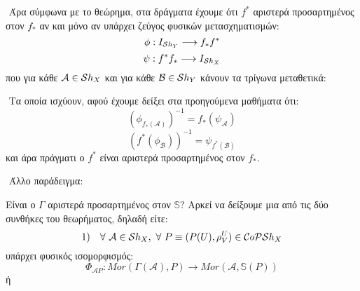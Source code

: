 $ $\newline
Άρα σύμφωνα με το θεώρημα, στα δράγματα έχουμε ότι $f^*$ αριστερά προσαρτημένος στον $f_*$ αν και μόνο αν υπάρχει ζεύγος φυσικών μετασχηματισμών:
$$\phi : I_{\mathcal{S} h_Y} \longrightarrow f_*f^*$$
$$\psi: f^*f_* \longrightarrow I_{\mathcal{S} h_X}$$ που για κάθε $\mathcal{A} \in \mathcal{S} h_X$ και για κάθε $\mathcal{B} \in \mathcal{S} h_Y$ κάνουν τα τρίγωνα μεταθετικά:

\begin{figure}[H]
    \centering
\end{figure}

$ $\newline
Τα οποία ισχύουν, αφού έχουμε δείξει στα προηγούμενα μαθήματα ότι:
$$\left(\phi_{f_*(\mathcal{A})} \right)^{-1} = f_*(\psi_{\mathcal{A}})$$
$$\left(f^*(\phi_{\mathcal{B}})\right)^{-1} = \psi_{f^*(\mathcal{B})}$$ και άρα πράγματι ο $f^*$ είναι αριστερά προσαρτημένος στον $f_*$.

$ $\newline
Άλλο παράδειγμα:
\begin{figure}[H]
    \centering
\end{figure}
\noindent Είναι ο $\Gamma$ αριστερά προσαρτημένος στον $\mathbb{S}$? Αρκεί να δείξουμε μια από τις δύο συνθήκες του θεωρήματος, δηλαδή είτε:
$$1) \quad \forall \ \mathcal{A} \in \mathcal{S} h_X, \ \forall \ P \equiv (P(U),\rho^U_V) \in \mathcal{C}o\mathcal{PS}h_X$$ υπάρχει φυσικός ισομορφισμός:
$$\Phi_{\mathcal{A}P}: Mor(\Gamma(\mathcal{A}),P) \longrightarrow Mor(\mathcal{A},\mathbb{S}(P))$$ ή 

